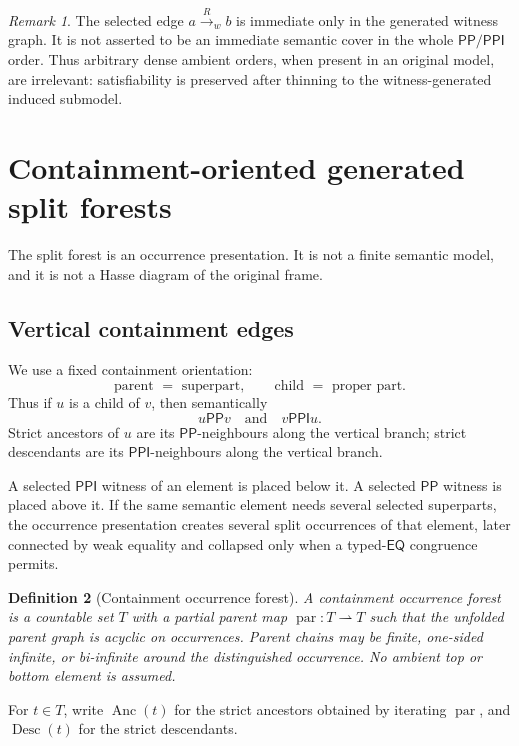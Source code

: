 \documentclass[11pt]{article}
\newtheorem{definition}{Definition}[section]
\theoremstyle{remark}
\newtheorem{remark}[definition]{Remark}
\newcommand{\PP}{\mathsf{PP}}
\newcommand{\PPI}{\mathsf{PPI}}
\newcommand{\EQ}{\mathsf{EQ}}
\newcommand{\parr}{\operatorname{par}}
\newcommand{\Anc}{\operatorname{Anc}}
\newcommand{\Desc}{\operatorname{Desc}}
\begin{document}
\begin{remark}
The selected edge $a\xrightarrow{R}_{w}b$ is immediate only in the generated witness graph.  It is not asserted to be an immediate semantic cover in the whole $\PP/\PPI$ order.  Thus arbitrary dense ambient orders, when present in an original model, are irrelevant: satisfiability is preserved after thinning to the witness-generated induced submodel.
\end{remark}

\section{Containment-oriented generated split forests}
The split forest is an occurrence presentation.  It is not a finite semantic model, and it is not a Hasse diagram of the original frame.

\subsection{Vertical containment edges}
We use a fixed containment orientation:
\[
\text{parent }=\text{ superpart},
\qquad
\text{child }=\text{ proper part}.
\]
Thus if $u$ is a child of $v$, then semantically
\[
u\PP v
\quad\text{and}\quad
v\PPI u.
\]
Strict ancestors of $u$ are its $\PP$-neighbours along the vertical branch; strict descendants are its $\PPI$-neighbours along the vertical branch.

A selected $\PPI$ witness of an element is placed below it.  A selected $\PP$ witness is placed above it.  If the same semantic element needs several selected superparts, the occurrence presentation creates several split occurrences of that element, later connected by weak equality and collapsed only when a typed-$\EQ$ congruence permits.

\begin{definition}[Containment occurrence forest]
A containment occurrence forest is a countable set $T$ with a partial parent map $\parr:T\rightharpoonup T$ such that the unfolded parent graph is acyclic on occurrences.  Parent chains may be finite, one-sided infinite, or bi-infinite around the distinguished occurrence.  No ambient top or bottom element is assumed.
\end{definition}

For $t\in T$, write $\Anc(t)$ for the strict ancestors obtained by iterating $\parr$, and $\Desc(t)$ for the strict descendants.
\end{document}
